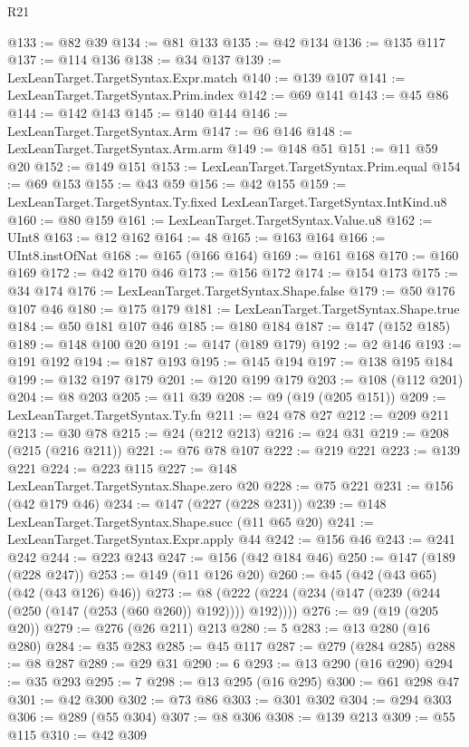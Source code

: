 \begin{lexlean}{R21}
\begin{coremodule}
@133 := @82 @39
@134 := @81 @133
@135 := @42 @134
@136 := @135 @117
@137 := @114 @136
@138 := @34 @137
@139 := LexLeanTarget.TargetSyntax.Expr.match
@140 := @139 @107
@141 := LexLeanTarget.TargetSyntax.Prim.index
@142 := @69 @141
@143 := @45 @86
@144 := @142 @143
@145 := @140 @144
@146 := LexLeanTarget.TargetSyntax.Arm
@147 := @6 @146
@148 := LexLeanTarget.TargetSyntax.Arm.arm
@149 := @148 @51
@151 := @11 @59 @20
@152 := @149 @151
@153 := LexLeanTarget.TargetSyntax.Prim.equal
@154 := @69 @153
@155 := @43 @59
@156 := @42 @155
@159 := LexLeanTarget.TargetSyntax.Ty.fixed LexLeanTarget.TargetSyntax.IntKind.u8
@160 := @80 @159
@161 := LexLeanTarget.TargetSyntax.Value.u8
@162 := UInt8
@163 := @12 @162
@164 := 48
@165 := @163 @164
@166 := UInt8.instOfNat
@168 := @165 (@166 @164)
@169 := @161 @168
@170 := @160 @169
@172 := @42 @170 @46
@173 := @156 @172
@174 := @154 @173
@175 := @34 @174
@176 := LexLeanTarget.TargetSyntax.Shape.false
@179 := @50 @176 @107 @46
@180 := @175 @179
@181 := LexLeanTarget.TargetSyntax.Shape.true
@184 := @50 @181 @107 @46
@185 := @180 @184
@187 := @147 (@152 @185)
@189 := @148 @100 @20
@191 := @147 (@189 @179)
@192 := @2 @146
@193 := @191 @192
@194 := @187 @193
@195 := @145 @194
@197 := @138 @195 @184
@199 := @132 @197 @179
@201 := @120 @199 @179
@203 := @108 (@112 @201)
@204 := @8 @203
@205 := @11 @39
@208 := @9 (@19 (@205 @151))
@209 := LexLeanTarget.TargetSyntax.Ty.fn
@211 := @24 @78 @27
@212 := @209 @211
@213 := @30 @78
@215 := @24 (@212 @213)
@216 := @24 @31
@219 := @208 (@215 (@216 @211))
@221 := @76 @78 @107
@222 := @219 @221
@223 := @139 @221
@224 := @223 @115
@227 := @148 LexLeanTarget.TargetSyntax.Shape.zero @20
@228 := @75 @221
@231 := @156 (@42 @179 @46)
@234 := @147 (@227 (@228 @231))
@239 := @148 LexLeanTarget.TargetSyntax.Shape.succ (@11 @65 @20)
@241 := LexLeanTarget.TargetSyntax.Expr.apply @44
@242 := @156 @46
@243 := @241 @242
@244 := @223 @243
@247 := @156 (@42 @184 @46)
@250 := @147 (@189 (@228 @247))
@253 := @149 (@11 @126 @20)
@260 := @45 (@42 (@43 @65) (@42 (@43 @126) @46))
@273 := @8 (@222 (@224 (@234 (@147 (@239 (@244 (@250 (@147 (@253 (@60 @260)) @192)))) @192))))
@276 := @9 (@19 (@205 @20))
@279 := @276 (@26 @211) @213
@280 := 5
@283 := @13 @280 (@16 @280)
@284 := @35 @283
@285 := @45 @117
@287 := @279 (@284 @285)
@288 := @8 @287
@289 := @29 @31
@290 := 6
@293 := @13 @290 (@16 @290)
@294 := @35 @293
@295 := 7
@298 := @13 @295 (@16 @295)
@300 := @61 @298 @47
@301 := @42 @300
@302 := @73 @86
@303 := @301 @302
@304 := @294 @303
@306 := @289 (@55 @304)
@307 := @8 @306
@308 := @139 @213
@309 := @55 @115
@310 := @42 @309

\end{coremodule}
\end{lexlean}
